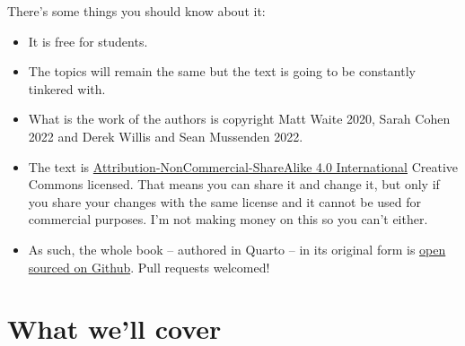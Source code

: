 \documentclass[
  letterpaper,
  DIV=11,
  numbers=noendperiod]{scrreprt}
\providecommand{\tightlist}{%
  \setlength{\itemsep}{0pt}\setlength{\parskip}{0pt}}\usepackage{longtable,booktabs,array}
\begin{document}
There's some things you should know about it:

\begin{itemize}
\tightlist
\item
  It is free for students.
\item
  The topics will remain the same but the text is going to be constantly
  tinkered with.
\item
  What is the work of the authors is copyright Matt Waite 2020, Sarah
  Cohen 2022 and Derek Willis and Sean Mussenden 2022.
\item
  The text is
  \href{https://creativecommons.org/licenses/by-nc-sa/4.0/}{Attribution-NonCommercial-ShareAlike
  4.0 International} Creative Commons licensed. That means you can share
  it and change it, but only if you share your changes with the same
  license and it cannot be used for commercial purposes. I'm not making
  money on this so you can't either.\\
\item
  As such, the whole book -- authored in Quarto -- in its original form
  is \href{https://github.com/dwillis/datajournalismbook}{open sourced
  on Github}. Pull requests welcomed!
\end{itemize}

\hypertarget{what-well-cover}{%
\section{What we'll cover}\label{what-well-cover}}
\end{document}

